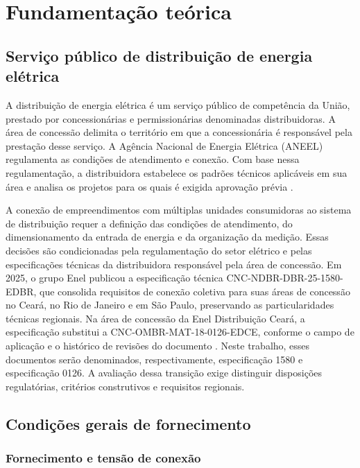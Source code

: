 \chapter{Fundamentação teórica}
\label{cap:fundamentacao}

\section{Serviço público de distribuição de energia elétrica}
\label{sec:servico-distribuicao}

A distribuição de energia elétrica é um serviço público de competência da União, prestado por concessionárias e permissionárias denominadas distribuidoras. A área de concessão delimita o território em que a concessionária é responsável pela prestação desse serviço. A Agência Nacional de Energia Elétrica (ANEEL) regulamenta as condições de atendimento e conexão. Com base nessa regulamentação, a distribuidora estabelece os padrões técnicos aplicáveis em sua área e analisa os projetos para os quais é exigida aprovação prévia \cite[arts.~1º, 2º, 20 e~50--54]{aneel1000}.

A conexão de empreendimentos com múltiplas unidades consumidoras ao sistema de distribuição requer a definição das condições de atendimento, do dimensionamento da entrada de energia e da organização da medição. Essas decisões são condicionadas pela regulamentação do setor elétrico e pelas especificações técnicas da distribuidora responsável pela área de concessão. Em 2025, o grupo Enel publicou a especificação técnica CNC-NDBR-DBR-25-1580-EDBR, que consolida requisitos de conexão coletiva para suas áreas de concessão no Ceará, no Rio de Janeiro e em São Paulo, preservando as particularidades técnicas regionais. Na área de concessão da Enel Distribuição Ceará, a especificação substitui a CNC-OMBR-MAT-18-0126-EDCE, conforme o campo de aplicação e o histórico de revisões do documento \cite[itens~1 e~2]{enel1580}. Neste trabalho, esses documentos serão denominados, respectivamente, especificação 1580 e especificação 0126. A avaliação dessa transição exige distinguir disposições regulatórias, critérios construtivos e requisitos regionais.

\section{Condições gerais de fornecimento}
\label{sec:regulamentacao}

\subsection{Fornecimento e tensão de conexão}

